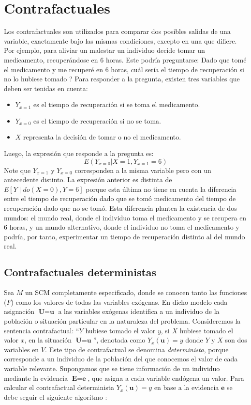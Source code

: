 \section{Contrafactuales}		
Los contrafactuales son utilizados para comparar dos posibles salidas de una variable, exactamente bajo las mismas condiciones, excepto en una que difiere. Por ejemplo, para aliviar un malestar un individuo decide tomar un medicamento, recuperándose en 6 horas. Este podría preguntarse: Dado que tomé el medicamento y me recuperé en 6 horas, \textquestiondown cuál sería el tiempo de recuperación si no lo hubiese tomado ? Para responder a la pregunta, existen tres variables que deben ser tenidas en cuenta:
\begin{itemize}
	\item $Y_{x=1}$ es el tiempo de recuperación si se toma el medicamento.
	\item $Y_{x=0}$ es el tiempo de recuperación si no se toma.
	\item $X$ representa la decisión de tomar o no el medicamento.	
\end{itemize}
Luego, la expresión que responde a la pregunta es:
\[ E(Y_{x=0}|X=1,Y_{x=1}=6) \]
Note que $Y_{x=1}$ y $Y_{x=0}$ corresponden a la misma variable pero con un antecedente distinto. La expresión anterior es distinta de $E[Y \mid do(X=0), Y=6]$ porque esta última no tiene en cuenta la diferencia entre el tiempo de recuperación dado que se tomó medicamento del tiempo de recuperación dado que no se tomó. Esta diferencia plantea la existencia de dos mundos: el mundo real, donde el individuo toma el medicamento y se recupera en 6 horas, y un mundo alternativo, donde el individuo no toma el medicamento y podría, por tanto, experimentar un tiempo de recuperación distinto al del mundo real.

\subsection{Contrafactuales deterministas}		
Sea $M$ un SCM completamente especificado, donde se conocen tanto las funciones ($F$) como los valores de todas las variables exógenas. En dicho modelo cada asignación $\textbf{U}=\textbf{u}$ a las variables exógenas identifica a un individuo de la población
o situación particular en la naturaleza del problema. Consideremos la sentencia contrafactual: \textquotedblleft $Y$ hubiese tomado el valor $y$, si $X$ hubiese tomado el valor $x$, en la situación $\textbf{U}=\textbf{u}$\textquotedblright, denotada como $Y_x(\textbf{u})=y$ donde $Y$ y $X$ son dos variables en $V$. Este tipo de contrafactual se denomina \textit{determinista}, porque corresponde a un individuo de la población del que conocemos el valor de cada variable relevante. Supongamos que se tiene información de un individuo mediante la evidencia $\textbf{E}=\textbf{e}$, que asigna a cada variable endógena un valor.  Para calcular el contrafactual determinista $Y_x(\textbf{u})=y$ en base a la evidencia $\textbf{e}$ se debe seguir el siguiente algoritmo \cite{pearl2016causal}:

